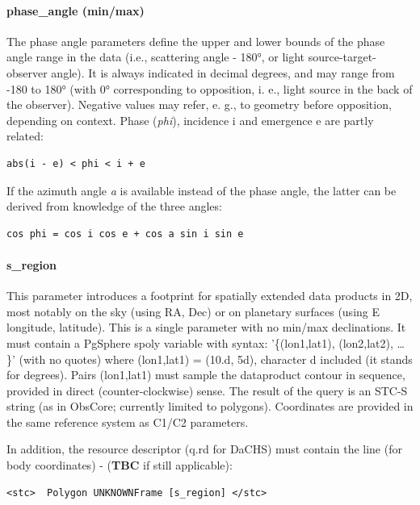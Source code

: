 \documentclass[11pt,a4paper]{ivoa}
\begin{document}
\paragraph{phase\_angle (min/max)}

The phase angle parameters define the upper and lower bounds of the phase angle range in the data (i.e., scattering angle - 180°, or light source-target-observer angle). It is always indicated in decimal degrees, and may range from -180 to 180° (with 0° corresponding to opposition, i. e., light source in the back of the observer). Negative values may refer, e. g., to geometry before opposition, depending on context. Phase (\emph{phi}), incidence i and emergence e are partly related:

\begin{verbatim}
abs(i - e) < phi < i + e
\end{verbatim}

If the azimuth angle \emph{a} is available instead of the phase angle, the latter can be derived from knowledge of the three angles:

\begin{verbatim}
cos phi = cos i cos e + cos a sin i sin e
\end{verbatim}

\paragraph{s\_region}

This parameter introduces a footprint for spatially extended data products in 2D, most notably on the sky (using RA, Dec) or on planetary surfaces (using E longitude, latitude). This is a single parameter with no min/max declinations. It must contain a PgSphere spoly variable with syntax: '\{(lon1,lat1), (lon2,lat2), … \}' (with no quotes) where (lon1,lat1) = (10.d, 5d), character d included (it stands for degrees). Pairs (lon1,lat1) must sample the dataproduct contour in sequence, provided in direct (counter-clockwise) sense. The result of the query is an STC-S string (as in ObsCore; currently limited to polygons). Coordinates are provided in the same reference system as C1/C2 parameters.

In addition, the resource descriptor (q.rd for DaCHS) must contain the line (for body coordinates) - (\textbf{TBC} if still applicable):

\begin{verbatim}
<stc>  Polygon UNKNOWNFrame [s_region] </stc>
\end{verbatim}
\end{document}
